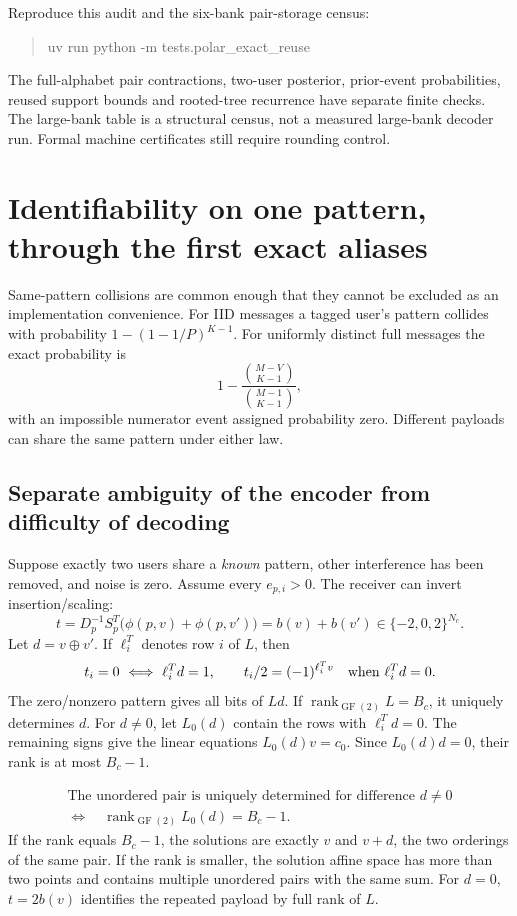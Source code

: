 \documentclass[10pt,a4paper]{article}
\newcommand{\GF}{\operatorname{GF}}
\begin{document}
Reproduce this audit and the six-bank pair-storage census:
\begin{quote}\small\ttfamily
uv run python -m tests.polar\_exact\_reuse
\end{quote}
The full-alphabet pair contractions, two-user posterior, prior-event probabilities, reused support bounds and
rooted-tree recurrence have separate finite checks. The large-bank table is a structural census, not a measured
large-bank decoder run. Formal machine certificates still require rounding control.

\clearpage
\section{Identifiability on one pattern, through the first exact aliases}
\label{sec:identifiability}
Same-pattern collisions are common enough that they cannot be excluded as an implementation convenience.
For IID messages a tagged user's pattern collides with probability $1-(1-1/P)^{K-1}$.
For uniformly distinct full messages the exact probability is
\[
 1-\frac{\binom{M-V}{K-1}}{\binom{M-1}{K-1}},
\]
with an impossible numerator event assigned probability zero. Different payloads can share the same pattern under
either law.

\subsection{Separate ambiguity of the encoder from difficulty of decoding}
Suppose exactly two users share a \emph{known} pattern, other interference has been removed, and noise is zero.
Assume every $e_{p,i}>0$. The receiver can invert insertion/scaling:
\begin{equation}
 t=D_p^{-1}S_p^T\big(\phi(p,v)+\phi(p,v')\big)=b(v)+b(v')\in\{-2,0,2\}^{N_c}.
\end{equation}
Let $d=v\oplus v'$. If $\ell_i^T$ denotes row $i$ of $L$, then
\begin{equation}
 t_i=0\ \Longleftrightarrow\ \ell_i^Td=1,\qquad
 t_i/2=(-1)^{\ell_i^Tv}\quad\hbox{when }\ell_i^Td=0.
 \label{eq:pair}
\end{equation}
The zero/nonzero pattern gives all bits of $Ld$. If $\operatorname{rank}_{\GF(2)}L=B_c$, it uniquely determines $d$.
For $d\ne0$, let $L_0(d)$ contain the rows with $\ell_i^Td=0$. The remaining signs give the linear equations
$L_0(d)v=c_0$. Since $L_0(d)d=0$, their rank is at most $B_c-1$.

\begin{equation}
 \boxed{\begin{gathered}
 \text{The unordered pair is uniquely determined for difference }d\ne0\\
 \Longleftrightarrow\quad \operatorname{rank}_{\GF(2)}L_0(d)=B_c-1.
 \end{gathered}}
 \label{eq:rank}
\end{equation}
If the rank equals $B_c-1$, the solutions are exactly $v$ and $v+d$, the two orderings of the same pair.
If the rank is smaller, the solution affine space has more than two points and contains multiple unordered pairs
with the same sum. For $d=0$, $t=2b(v)$ identifies the repeated payload by full rank of $L$.
\end{document}
